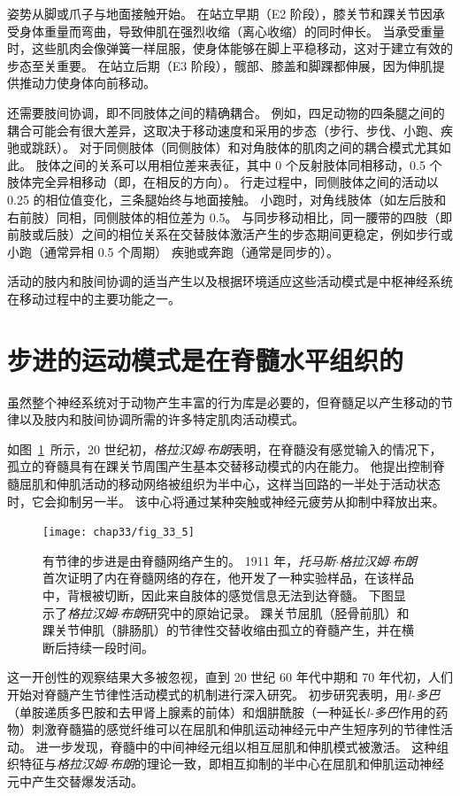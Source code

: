 姿势从脚或爪子与地面接触开始。
在站立早期（E2 阶段），膝关节和踝关节因承受身体重量而弯曲，导致伸肌在强烈收缩（离心收缩）的同时伸长。
当承受重量时，这些肌肉会像弹簧一样屈服，使身体能够在脚上平稳移动，这对于建立有效的步态至关重要。
在站立后期（E3 阶段），髋部、膝盖和脚踝都伸展，因为伸肌提供推动力使身体向前移动。


还需要肢间协调，即不同肢体之间的精确耦合。
例如，四足动物的四条腿之间的耦合可能会有很大差异，这取决于移动速度和采用的步态（步行、步伐、小跑、疾驰或跳跃）。
对于同侧肢体（同侧肢体）和对角肢体的肌肉之间的耦合模式尤其如此。
肢体之间的关系可以用相位差来表征，其中 0 个反射肢体同相移动，0.5 个肢体完全异相移动（即，在相反的方向）。
行走过程中，同侧肢体之间的活动以 0.25 的相位值变化，三条腿始终与地面接触。
小跑时，对角线肢体（如左后肢和右前肢）同相，同侧肢体的相位差为 0.5。
与同步移动相比，同一腰带的四肢（即前肢或后肢）之间的相位关系在交替肢体激活产生的步态期间更稳定，例如步行或小跑（通常异相 0.5 个周期） 疾驰或奔跑（通常是同步的）。


活动的肢内和肢间协调的适当产生以及根据环境适应这些活动模式是中枢神经系统在移动过程中的主要功能之一。



\section{步进的运动模式是在脊髓水平组织的}

虽然整个神经系统对于动物产生丰富的行为库是必要的，但脊髓足以产生移动的节律以及肢内和肢间协调所需的许多特定肌肉活动模式。


如图~\ref{fig:33_5}~所示，20 世纪初，\textit{格拉汉姆$\cdot$布朗}表明，在脊髓没有感觉输入的情况下，孤立的脊髓具有在踝关节周围产生基本交替移动模式的内在能力。
他提出控制脊髓屈肌和伸肌活动的移动网络被组织为半中心，这样当回路的一半处于活动状态时，它会抑制另一半。
该中心将通过某种突触或神经元疲劳从抑制中释放出来。


\begin{figure}[htbp]
	\centering
	\texttt{[image: chap33/fig\_33\_5]}
	\caption{有节律的步进是由脊髓网络产生的。
	1911 年，\textit{托马斯$\cdot$格拉汉姆$\cdot$布朗}首次证明了内在脊髓网络的存在，他开发了一种实验样品，在该样品中，背根被切断，因此来自肢体的感觉信息无法到达脊髓。
	下图显示了\textit{格拉汉姆$\cdot$布朗}研究中的原始记录。
	踝关节屈肌（胫骨前肌）和踝关节伸肌（腓肠肌）的节律性交替收缩由孤立的脊髓产生，并在横断后持续一段时间。}
	\label{fig:33_5}
\end{figure}


这一开创性的观察结果大多被忽视，直到 20 世纪 60 年代中期和 70 年代初，人们开始对脊髓产生节律性活动模式的机制进行深入研究。
初步研究表明，用\textit{l-多巴}（单胺递质多巴胺和去甲肾上腺素的前体）和烟肼酰胺（一种延长\textit{l-多巴}作用的药物）刺激脊髓猫的感觉纤维可以在屈肌和伸肌运动神经元中产生短序列的节律性活动。
进一步发现，脊髓中的中间神经元组以相互屈肌和伸肌模式被激活。
这种组织特征与\textit{格拉汉姆$\cdot$布朗}的理论一致，即相互抑制的半中心在屈肌和伸肌运动神经元中产生交替爆发活动。



